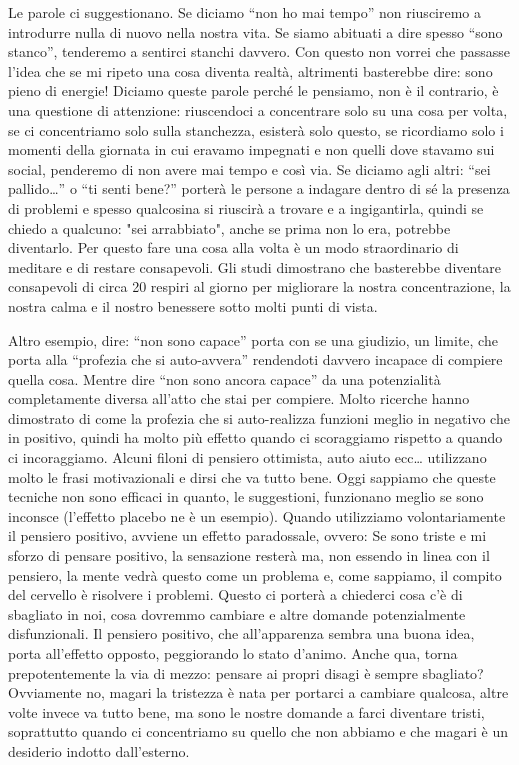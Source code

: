 \documentclass[12pt]{book} %
\begin{document}
Le parole ci suggestionano. Se diciamo “non ho mai tempo” non riusciremo a introdurre nulla di nuovo nella nostra vita.
Se siamo abituati a dire spesso “sono stanco”, tenderemo a sentirci stanchi davvero. Con questo non vorrei che passasse l'idea che se mi ripeto una cosa diventa realtà, altrimenti basterebbe dire: sono pieno di energie! Diciamo queste parole perché le pensiamo, non è il contrario, è una questione di attenzione: riuscendoci a concentrare solo su una cosa per volta, se ci concentriamo solo sulla stanchezza, esisterà solo questo, se ricordiamo solo i momenti della giornata in cui eravamo impegnati e non quelli dove stavamo sui social, penderemo di non avere mai tempo e così via. Se diciamo agli altri: “sei pallido…” o “ti senti bene?” porterà le persone a indagare dentro di sé la presenza di problemi e spesso qualcosina si riuscirà a trovare e a ingigantirla, quindi se chiedo a qualcuno: "sei arrabbiato", anche se prima non lo era, potrebbe diventarlo. Per questo fare una cosa alla volta è un modo straordinario di meditare e di restare consapevoli. Gli studi dimostrano che basterebbe diventare consapevoli di circa 20 respiri al giorno per migliorare la nostra concentrazione, la nostra calma e il nostro benessere sotto molti punti di vista.

Altro esempio, dire: “non sono capace” porta con se una giudizio, un limite, che porta alla “profezia che si
auto-avvera” rendendoti davvero incapace di compiere quella cosa. Mentre dire “non sono ancora capace” da una
potenzialità completamente diversa all'atto che stai per compiere. Molto ricerche hanno dimostrato di come la profezia
che si auto-realizza funzioni meglio in negativo che in positivo, quindi ha molto più effetto quando ci scoraggiamo
rispetto a quando ci incoraggiamo. Alcuni filoni di pensiero ottimista, auto aiuto ecc… utilizzano molto le frasi
motivazionali e dirsi che va tutto bene. Oggi sappiamo che queste tecniche non sono efficaci in quanto, le suggestioni,
funzionano meglio se sono inconsce (l'effetto placebo ne è un esempio). Quando utilizziamo
volontariamente il pensiero positivo, avviene un effetto paradossale, ovvero: Se sono triste e mi sforzo di pensare
positivo, la sensazione resterà ma, non essendo in linea con il pensiero, la mente vedrà questo come un problema e,
come sappiamo, il compito del cervello è risolvere i problemi. Questo ci porterà a chiederci cosa
c'è di sbagliato in noi, cosa dovremmo cambiare e altre domande potenzialmente disfunzionali. Il
pensiero positivo, che all'apparenza sembra una buona idea, porta all'effetto
opposto, peggiorando lo stato d'animo. Anche qua, torna prepotentemente la via di mezzo: pensare
ai propri disagi è sempre sbagliato? Ovviamente no, magari la tristezza è nata per portarci a cambiare qualcosa, altre
volte invece va tutto bene, ma sono le nostre domande a farci diventare tristi, soprattutto quando ci concentriamo su
quello che non abbiamo e che magari è un desiderio indotto dall'esterno.
\end{document}
